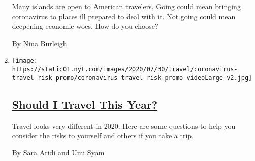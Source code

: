 \begin{enumerate}
  Many islands are open to American travelers. Going could mean bringing
  coronavirus to places ill prepared to deal with it. Not going could
  mean deepening economic woes. How do you choose?

  By Nina Burleigh
\item
  \texttt{[image: https://static01.nyt.com/images/2020/07/30/travel/coronavirus-travel-risk-promo/coronavirus-travel-risk-promo-videoLarge-v2.jpg]}

  \hypertarget{should-i-travel-this-year}{%
  \subsection{\texorpdfstring{\href{/interactive/2020/07/31/travel/coronavirus-travel-risk.html}{Should
  I Travel This
  Year?}}{Should I Travel This Year?}}\label{should-i-travel-this-year}}

  Travel looks very different in 2020. Here are some questions to help
  you consider the risks to yourself and others if you take a trip.

  By Sara Aridi and Umi Syam
\end{enumerate}

